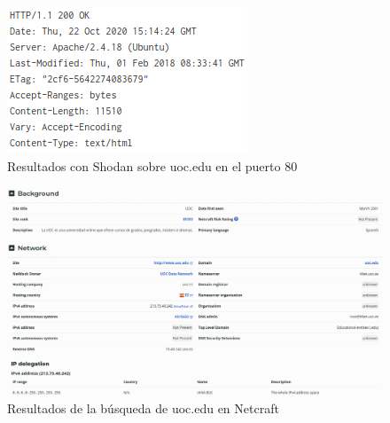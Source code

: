 \documentclass[10pt,a4paper]{article}
\begin{document}
\pagebreak

\begin{figure}[h!]
  \centering
  \includegraphics[scale=0.5]{headers.png}
  \caption{Resultados con Shodan sobre uoc.edu en el puerto 80}
  \label{fig:otg-info-002-2}
\end{figure}

\begin{figure}[h!]
  \centering
  \includegraphics[scale=0.25]{netcraft.png}
  \caption{Resultados de la búsqueda de uoc.edu en Netcraft}
  \label{fig:otg-info-002-3}
\end{figure}

\pagebreak
\end{document}
